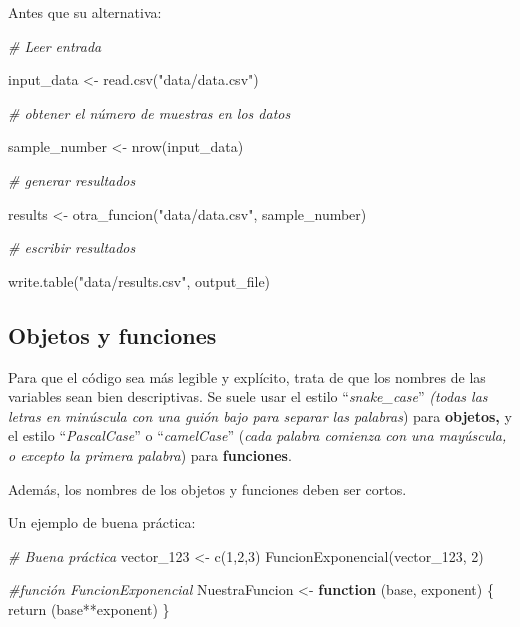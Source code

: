 \documentclass[
]{book}
\newenvironment{Shaded}{\begin{snugshade}}{\end{snugshade}}
\newcommand{\CommentTok}[1]{\textcolor[rgb]{0.56,0.35,0.01}{\textit{#1}}}
\newcommand{\ControlFlowTok}[1]{\textcolor[rgb]{0.13,0.29,0.53}{\textbf{#1}}}
\newcommand{\DecValTok}[1]{\textcolor[rgb]{0.00,0.00,0.81}{#1}}
\newcommand{\FunctionTok}[1]{\textcolor[rgb]{0.00,0.00,0.00}{#1}}
\newcommand{\NormalTok}[1]{#1}
\newcommand{\OtherTok}[1]{\textcolor[rgb]{0.56,0.35,0.01}{#1}}
\newcommand{\SpecialCharTok}[1]{\textcolor[rgb]{0.00,0.00,0.00}{#1}}
\newcommand{\StringTok}[1]{\textcolor[rgb]{0.31,0.60,0.02}{#1}}
\begin{document}
Antes que su alternativa:

\begin{Shaded}
\begin{Highlighting}[]
\CommentTok{\# Leer entrada}

\NormalTok{input\_data }\OtherTok{\textless{}{-}} \FunctionTok{read.csv}\NormalTok{(}\StringTok{"data/data.csv"}\NormalTok{)}

\CommentTok{\# obtener el número de muestras en los datos}

\NormalTok{sample\_number }\OtherTok{\textless{}{-}} \FunctionTok{nrow}\NormalTok{(input\_data)}

\CommentTok{\# generar resultados}

\NormalTok{results }\OtherTok{\textless{}{-}} \FunctionTok{otra\_funcion}\NormalTok{(}\StringTok{"data/data.csv"}\NormalTok{, sample\_number)}

\CommentTok{\# escribir resultados}

\FunctionTok{write.table}\NormalTok{(}\StringTok{"data/results.csv"}\NormalTok{, output\_file)}
\end{Highlighting}
\end{Shaded}

\hypertarget{objetos-y-funciones}{%
\subsection{Objetos y funciones}\label{objetos-y-funciones}}

Para que el código sea más legible y explícito, trata de que los nombres de las variables sean bien descriptivas. Se suele usar el estilo ``\emph{snake\_case}'' \emph{(todas las letras en minúscula con una guión bajo para separar las palabras}) para \textbf{objetos,} y el estilo ``\emph{PascalCase}'' o ``\emph{camelCase}'' (\emph{cada palabra comienza con una mayúscula, o excepto la primera palabra}) para \textbf{funciones}.

Además, los nombres de los objetos y funciones deben ser cortos.

Un ejemplo de buena práctica:

\begin{Shaded}
\begin{Highlighting}[]
\CommentTok{\# Buena práctica}
\NormalTok{vector\_123 }\OtherTok{\textless{}{-}} \FunctionTok{c}\NormalTok{(}\DecValTok{1}\NormalTok{,}\DecValTok{2}\NormalTok{,}\DecValTok{3}\NormalTok{)}
\FunctionTok{FuncionExponencial}\NormalTok{(vector\_123, }\DecValTok{2}\NormalTok{)}

\CommentTok{\#función FuncionExponencial}
\NormalTok{NuestraFuncion }\OtherTok{\textless{}{-}} \ControlFlowTok{function}\NormalTok{ (base, exponent) \{}
  \FunctionTok{return}\NormalTok{ (base}\SpecialCharTok{**}\NormalTok{exponent)}
\NormalTok{\}}
\end{Highlighting}
\end{Shaded}
\end{document}
